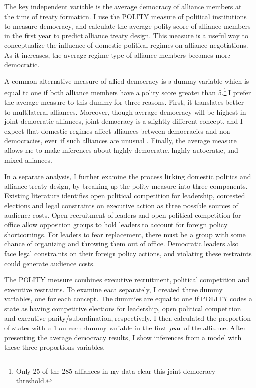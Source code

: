 \documentclass[12pt]{article}
\begin{document}
The key independent variable is the average democracy of alliance members at the time of treaty formation. 
I use the POLITY measure of political institutions to measure democracy, and calculate the average polity score of alliance members in the first year to predict alliance treaty design. 
This measure is a useful way to conceptualize the influence of domestic political regimes on alliance negotiations. 
As it increases, the average regime type of alliance members becomes more democratic. 


A common alternative measure of allied democracy is a dummy variable which is equal to one if both alliance members have a polity score greater than 5.\footnote{Only 25 of the 285 alliances in my data clear this joint democracy threshold.}
I prefer the average measure to this dummy for three reasons.
First, it translates better to multilateral alliances. 
Moreover, though average democracy will be highest in joint democratic alliances, joint democracy is a slightly different concept, and I expect that domestic regimes affect alliances between democracies and non-democracies, even if such alliances are unusual \citep{Leeds1999}.
Finally, the average measure allows me to make inferences about highly democratic, highly autocratic, and mixed alliances. 


In a separate analysis, I further examine the process linking domestic politics and alliance treaty design, by breaking up the polity measure into three components. 
Existing literature identifies open political competition for leadership, contested elections and legal constraints on executive action as three possible sources of audience costs. 
Open recruitment of leaders and open political competition for office allow opposition groups to hold leaders to account for foreign policy shortcomings. 
For leaders to fear replacement, there must be a group with some chance of organizing and throwing them out of office.
Democratic leaders also face legal constraints on their foreign policy actions, and violating these restraints could generate audience costs. 

 
The POLITY measure combines executive recruitment, political competition and executive restraints. 
To examine each separately, I created three dummy variables, one for each concept. 
The dummies are equal to one if POLITY codes a state as having competitive elections for leadership, open political competition and executive parity/subordination, respectively. 
I then calculated the proportion of states with a 1 on each dummy variable in the first year of the alliance. 
After presenting the average democracy results, I show inferences from a model with these three proportions variables.
\end{document}
